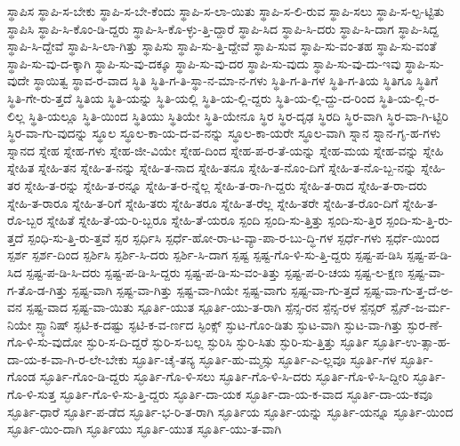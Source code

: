 {ಸ್ಥಾಪಿಸ
ಸ್ಥಾಪಿ-ಸ-ಬೇಕು
ಸ್ಥಾಪಿ-ಸ-ಬೇ-ಕೆಂದು
ಸ್ಥಾಪಿ-ಸ-ಲಾ-ಯಿತು
ಸ್ಥಾಪಿ-ಸ-ಲಿ-ರುವ
ಸ್ಥಾಪಿ-ಸಲು
ಸ್ಥಾಪಿ-ಸ-ಲ್ಪ-ಟ್ಟಿತು
ಸ್ಥಾಪಿಸಿ
ಸ್ಥಾಪಿ-ಸಿ-ಕೊಂ-ಡಿ-ದ್ದರು
ಸ್ಥಾಪಿ-ಸಿ-ಕೊ-ಳ್ಳು-ತ್ತಿ-ದ್ದಾರೆ
ಸ್ಥಾಪಿ-ಸಿದ
ಸ್ಥಾಪಿ-ಸಿ-ದರು
ಸ್ಥಾಪಿ-ಸಿ-ದಾಗ
ಸ್ಥಾಪಿ-ಸಿದ್ದ
ಸ್ಥಾಪಿ-ಸಿ-ದ್ದೇವೆ
ಸ್ಥಾಪಿ-ಸಿ-ಲಾ-ಗಿತ್ತು
ಸ್ಥಾಪಿಸು
ಸ್ಥಾಪಿ-ಸು-ತ್ತಿ-ದ್ದೇವೆ
ಸ್ಥಾಪಿ-ಸುವ
ಸ್ಥಾಪಿ-ಸು-ವಂ-ತಹ
ಸ್ಥಾಪಿ-ಸು-ವಂತೆ
ಸ್ಥಾಪಿ-ಸು-ವು-ದ-ಕ್ಕಾಗಿ
ಸ್ಥಾಪಿ-ಸು-ವು-ದಕ್ಕೂ
ಸ್ಥಾಪಿ-ಸು-ವು-ದರ
ಸ್ಥಾಪಿ-ಸು-ವುದು
ಸ್ಥಾಪಿ-ಸು-ವು-ದು-ಇವು
ಸ್ಥಾಪಿ-ಸು-ವುದೇ
ಸ್ಥಾಯಿತ್ವ
ಸ್ಥಾವ-ರ-ವಾದ
ಸ್ಥಿತಿ
ಸ್ಥಿತಿ-ಗ-ತಿ-ಸ್ಥಾ-ನ-ಮಾ-ನ-ಗಳು
ಸ್ಥಿತಿ-ಗ-ತಿ-ಗಳ
ಸ್ಥಿತಿ-ಗ-ತಿಯ
ಸ್ಥಿತಿಗೂ
ಸ್ಥಿತಿಗೆ
ಸ್ಥಿತಿ-ಗೇ-ರು-ತ್ತದೆ
ಸ್ಥಿತಿಯ
ಸ್ಥಿತಿ-ಯನ್ನು
ಸ್ಥಿತಿ-ಯಲ್ಲಿ
ಸ್ಥಿತಿ-ಯ-ಲ್ಲಿ-ದ್ದರು
ಸ್ಥಿತಿ-ಯ-ಲ್ಲಿ-ದ್ದು-ದ-ರಿಂದ
ಸ್ಥಿತಿ-ಯ-ಲ್ಲಿ-ರ-ಲಿಲ್ಲ
ಸ್ಥಿತಿ-ಯಲ್ಲೂ
ಸ್ಥಿತಿ-ಯಿಂದ
ಸ್ಥಿತಿಯು
ಸ್ಥಿತಿಯೇ
ಸ್ಥಿತಿ-ಯೇನೂ
ಸ್ಥಿರ
ಸ್ಥಿರ-ದೃಢ
ಸ್ಥಿರದಿ
ಸ್ಥಿರ-ವಾಗಿ
ಸ್ಥಿರ-ವಾ-ಗಿ-ಟ್ಟಿರಿ
ಸ್ಥಿರ-ವಾ-ಗು-ವುದನ್ನು
ಸ್ಥೂಲ
ಸ್ಥೂಲ-ಕಾ-ಯ-ದ-ವ-ನನ್ನು
ಸ್ಥೂಲ-ಕಾ-ಯರೇ
ಸ್ಥೂಲ-ವಾಗಿ
ಸ್ನಾನ
ಸ್ನಾನ-ಗೃ-ಹ-ಗಳು
ಸ್ನಾನದ
ಸ್ನೇಹ
ಸ್ನೇಹ-ಗಳು
ಸ್ನೇಹ-ಜೀ-ವಿಯೇ
ಸ್ನೇಹ-ದಿಂದ
ಸ್ನೇಹ-ಪ-ರ-ತೆ-ಯನ್ನು
ಸ್ನೇಹ-ಮಯ
ಸ್ನೇಹ-ವನ್ನು
ಸ್ನೇಹಿ
ಸ್ನೇಹಿತ
ಸ್ನೇಹಿ-ತನ
ಸ್ನೇಹಿ-ತ-ನನ್ನು
ಸ್ನೇಹಿ-ತ-ನಾದ
ಸ್ನೇಹಿ-ತನೂ
ಸ್ನೇಹಿ-ತ-ನೊಂ-ದಿಗೆ
ಸ್ನೇಹಿ-ತ-ನೊ-ಬ್ಬ-ನನ್ನು
ಸ್ನೇಹಿ-ತರ
ಸ್ನೇಹಿ-ತ-ರನ್ನು
ಸ್ನೇಹಿ-ತ-ರನ್ನೂ
ಸ್ನೇಹಿ-ತ-ರ-ನ್ನೆಲ್ಲ
ಸ್ನೇಹಿ-ತ-ರಾ-ಗಿ-ದ್ದರು
ಸ್ನೇಹಿ-ತ-ರಾದ
ಸ್ನೇಹಿ-ತ-ರಾ-ದರು
ಸ್ನೇಹಿ-ತ-ರಾರೂ
ಸ್ನೇಹಿ-ತ-ರಿಗೆ
ಸ್ನೇಹಿ-ತರು
ಸ್ನೇಹಿ-ತರೂ
ಸ್ನೇಹಿ-ತ-ರೆಲ್ಲ
ಸ್ನೇಹಿ-ತರೇ
ಸ್ನೇಹಿ-ತ-ರೊಂ-ದಿಗೆ
ಸ್ನೇಹಿ-ತ-ರೊ-ಬ್ಬರ
ಸ್ನೇಹಿತೆ
ಸ್ನೇಹಿ-ತೆ-ಯ-ರಿ-ಬ್ಬರೂ
ಸ್ನೇಹಿ-ತೆ-ಯರೂ
ಸ್ಪಂದಿ
ಸ್ಪಂದಿ-ಸು-ತ್ತಿತ್ತು
ಸ್ಪಂದಿ-ಸು-ತ್ತಿರ
ಸ್ಪಂದಿ-ಸು-ತ್ತಿ-ರು-ತ್ತದೆ
ಸ್ಪಂಧಿ-ಸು-ತ್ತಿ-ರು-ತ್ತವೆ
ಸ್ಪರ
ಸ್ಪರ್ಧಿಸಿ
ಸ್ಪರ್ಧೆ-ಹೋ-ರಾ-ಟ-ವ್ಯಾ-ಪಾ-ರ-ಬು-ದ್ಧಿ-ಗಳ
ಸ್ಪರ್ಧೆ-ಗಳು
ಸ್ಪರ್ಧೆ-ಯಿಂದ
ಸ್ಪರ್ಶ
ಸ್ಪರ್ಶ-ದಿಂದ
ಸ್ಪರ್ಶಿಸಿ
ಸ್ಪರ್ಶಿ-ಸಿ-ದರು
ಸ್ಪರ್ಶಿ-ಸಿ-ದಾಗ
ಸ್ಪಷ್ಟ
ಸ್ಪಷ್ಟ-ಗೊ-ಳಿ-ಸು-ತ್ತಿ-ದ್ದರು
ಸ್ಪಷ್ಟ-ಪ-ಡಿಸಿ
ಸ್ಪಷ್ಟ-ಪ-ಡಿ-ಸಿದ
ಸ್ಪಷ್ಟ-ಪ-ಡಿ-ಸಿ-ದರು
ಸ್ಪಷ್ಟ-ಪ-ಡಿ-ಸಿ-ದ್ದರು
ಸ್ಪಷ್ಟ-ಪ-ಡಿ-ಸು-ವಂ-ತಿತ್ತು
ಸ್ಪಷ್ಟ-ಪ-ರಿ-ಚಯ
ಸ್ಪಷ್ಟ-ಲ-ಕ್ಷಣ
ಸ್ಪಷ್ಟ-ವಾ-ಗ-ತೊ-ಡ-ಗಿತ್ತು
ಸ್ಪಷ್ಟ-ವಾಗಿ
ಸ್ಪಷ್ಟ-ವಾ-ಗಿತ್ತು
ಸ್ಪಷ್ಟ-ವಾ-ಗಿಯೇ
ಸ್ಪಷ್ಟ-ವಾಗು
ಸ್ಪಷ್ಟ-ವಾ-ಗು-ತ್ತದೆ
ಸ್ಪಷ್ಟ-ವಾ-ಗು-ತ್ತ-ದೆ-ಅ-ವನ
ಸ್ಪಷ್ಟ-ವಾದ
ಸ್ಪಷ್ಟ-ವಾ-ಯಿತು
ಸ್ಪೂರ್ತಿ-ಯುತ
ಸ್ಪೂರ್ತಿ-ಯು-ತ-ರಾಗಿ
ಸ್ಪೆನ್ಸ-ರನ
ಸ್ಪೆನ್ಸ-ರಳ
ಸ್ಪೆನ್ಸರ್
ಸ್ಪೈನ್-ಜ-ರ್ಮ-ನಿಯೇ
ಸ್ಪ್ಯಾನಿಷ್
ಸ್ಫಟಿ-ಕ-ದಷ್ಟು
ಸ್ಫಟಿ-ಕ-ವ-ರ್ಣದ
ಸ್ಫಿಂಕ್ಸ್
ಸ್ಫುಟ-ಗೊಂ-ಡಿತು
ಸ್ಫುಟ-ವಾಗಿ
ಸ್ಫುಟ-ವಾ-ಗಿತ್ತು
ಸ್ಫುರ-ಣೆ-ಗೊ-ಳಿ-ಸು-ವುದೋ
ಸ್ಫುರಿ-ಸ-ದಿ-ದ್ದರೆ
ಸ್ಫುರಿ-ಸ-ಬಲ್ಲ
ಸ್ಫುರಿಸಿ
ಸ್ಫುರಿ-ಸಿತು
ಸ್ಫುರಿ-ಸು-ತ್ತಿತ್ತು
ಸ್ಫೂರ್ತಿ
ಸ್ಫೂರ್ತಿ-ಉ-ತ್ಸಾ-ಹ-ದಾ-ಯ-ಕ-ವಾ-ಗಿ-ರ-ಲೇ-ಬೇಕು
ಸ್ಫೂರ್ತಿ-ಚೈ-ತನ್ಯ
ಸ್ಫೂರ್ತಿ-ಹು-ಮ್ಮಸ್ಸು
ಸ್ಫೂರ್ತಿ-ಎ-ಲ್ಲವೂ
ಸ್ಫೂರ್ತಿ-ಗಳ
ಸ್ಫೂರ್ತಿ-ಗೊಂಡ
ಸ್ಫೂರ್ತಿ-ಗೊಂ-ಡಿ-ದ್ದರು
ಸ್ಫೂರ್ತಿ-ಗೊ-ಳಿ-ಸಲು
ಸ್ಫೂರ್ತಿ-ಗೊ-ಳಿ-ಸಿ-ದರು
ಸ್ಫೂರ್ತಿ-ಗೊ-ಳಿ-ಸಿ-ದ್ದೀರಿ
ಸ್ಫೂರ್ತಿ-ಗೊ-ಳಿ-ಸುತ್ತ
ಸ್ಫೂರ್ತಿ-ಗೊ-ಳಿ-ಸು-ತ್ತಿ-ದ್ದರು
ಸ್ಫೂರ್ತಿ-ದಾ-ಯಕ
ಸ್ಫೂರ್ತಿ-ದಾ-ಯ-ಕ-ವಾದ
ಸ್ಫೂರ್ತಿ-ದಾ-ಯ-ಕವೂ
ಸ್ಫೂರ್ತಿ-ಧಾರೆ
ಸ್ಫೂರ್ತಿ-ಪ-ಡೆದ
ಸ್ಫೂರ್ತಿ-ಭ-ರಿ-ತ-ರಾಗಿ
ಸ್ಫೂರ್ತಿಯ
ಸ್ಫೂರ್ತಿ-ಯನ್ನು
ಸ್ಫೂರ್ತಿ-ಯನ್ನೂ
ಸ್ಫೂರ್ತಿ-ಯಿಂದ
ಸ್ಫೂರ್ತಿ-ಯಿಂ-ದಾಗಿ
ಸ್ಫೂರ್ತಿಯು
ಸ್ಫೂರ್ತಿ-ಯುತ
ಸ್ಫೂರ್ತಿ-ಯು-ತ-ವಾಗಿ
}
